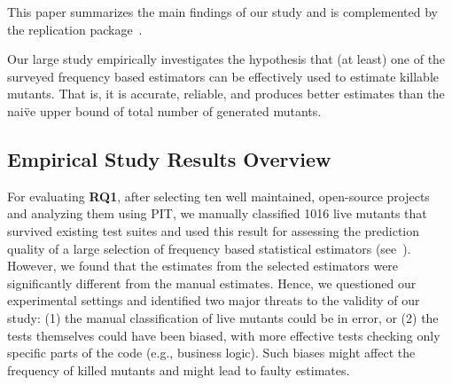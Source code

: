 \documentclass[sigconf,review,anonymous]{acmart}
\newcommand{\estimatorCount}{twelve\xspace}
\newcommand{\projectCount}{ten\xspace}
\newcommand{\PIT}{\textsc{PIT}\xspace}
\begin{document}

This paper summarizes 
the main findings of our study and is complemented by
the replication package~\cite{replication-package}.

\begin{tcolorbox}[boxrule=0.5pt, arc=4pt, boxsep=0pt, width=\columnwidth]
Our large study empirically investigates the hypothesis that (at least)
one of the surveyed frequency based estimators can be effectively used to
estimate killable mutants.
That is, it is accurate, reliable, and
produces better estimates than the nai\"ve upper bound of total
number of generated mutants.
\end{tcolorbox}

\subsection{Empirical Study Results Overview}
For evaluating \textbf{RQ1}, after selecting \projectCount well maintained,
open-source projects and analyzing them
using PIT, we manually classified 1016 live mutants that survived existing test suites and used this result for assessing the prediction quality of
a large selection of frequency based statistical estimators (see~).
However, we found that
the estimates from the selected estimators
were significantly different from the manual estimates.
Hence, we questioned our experimental settings
and identified two major threats to the validity of our study:
(1) the manual classification of live mutants could be in error, or
%
%
(2) the tests themselves could have been biased, with more effective tests checking
 only specific parts of the code (e.g., business logic).
Such biases might affect the frequency of killed mutants and might lead to faulty estimates.
\end{document}
